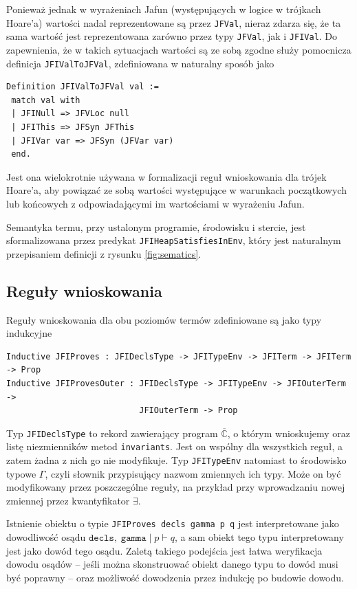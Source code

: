 \documentclass[]{pracamgr}
\renewcommand \| {\hspace{0.75em} | \hspace{0.75em} }
\renewcommand \[ {[\![}
\renewcommand \] {]\!]}
\theoremstyle{definition}
\begin{document}
Ponieważ jednak w wyrażeniach Jafun (występujących w logice w trójkach Hoare'a)
wartości nadal reprezentowane są przez \texttt{JFVal}, nieraz zdarza się, że ta sama wartość
jest reprezentowana zarówno przez typy \texttt{JFVal}, jak i \texttt{JFIVal}.
Do zapewnienia, że w takich sytuacjach wartości są ze sobą zgodne służy pomocnicza
definicja \texttt{JFIValToJFVal}, zdefiniowana w naturalny sposób jako
\begin{verbatim}
Definition JFIValToJFVal val :=
 match val with
 | JFINull => JFVLoc null
 | JFIThis => JFSyn JFThis
 | JFIVar var => JFSyn (JFVar var)
 end.
\end{verbatim}
Jest ona wielokrotnie używana w formalizacji reguł wnioskowania dla trójek Hoare'a,
aby powiązać ze sobą wartości występujące w warunkach początkowych lub końcowych
z odpowiadającymi im wartościami w wyrażeniu Jafun.

Semantyka termu, przy ustalonym programie, środowisku i stercie,
jest sformalizowana przez predykat \texttt{JFIHeapSatisfiesInEnv}, który
jest naturalnym przepisaniem definicji z rysunku \ref{fig:sematics}.

\subsection{Reguły wnioskowania}
Reguły wnioskowania dla obu poziomów termów zdefiniowane są jako typy indukcyjne
\begin{verbatim}
Inductive JFIProves : JFIDeclsType -> JFITypeEnv -> JFITerm -> JFITerm -> Prop
Inductive JFIProvesOuter : JFIDeclsType -> JFITypeEnv -> JFIOuterTerm ->
                           JFIOuterTerm -> Prop
\end{verbatim}
Typ \texttt{JFIDeclsType} to rekord zawierający program $\overline{\mathbb{C}}$,
o którym wnioskujemy oraz listę niezmienników metod \texttt{invariants}.
Jest on wspólny dla wszystkich reguł, a zatem żadna z nich go nie modyfikuje.
Typ \texttt{JFITypeEnv} natomiast to środowisko typowe $\Gamma$,
czyli słownik przypisujący nazwom zmiennych ich typy. Może on być modyfikowany przez
poszczególne reguły, na przykład przy wprowadzaniu nowej zmiennej przez
kwantyfikator $\exists$.

Istnienie obiektu o typie \texttt{JFIProves decls gamma p q} jest interpretowane jako
dowodliwość osądu $\mathtt{decls,\; gamma}\; |\; p \vdash q$, a sam obiekt tego typu
interpretowany jest jako dowód tego osądu.
Zaletą takiego podejścia jest łatwa weryfikacja dowodu osądów -- jeśli można
skonstruować obiekt danego typu to dowód musi być poprawny -- oraz możliwość
dowodzenia przez indukcję po budowie dowodu.
\end{document}
